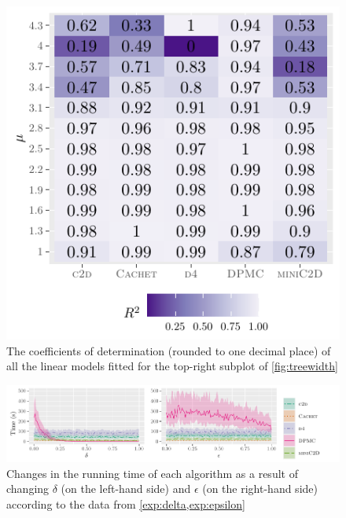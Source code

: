 \documentclass{article}
\theoremstyle{definition}
\begin{document}
\begin{figure}[t]
  \centering
  \includegraphics{r2}
  \caption{The coefficients of determination (rounded to one decimal place) of
    all the linear models fitted for the top-right subplot of
    \cref{fig:treewidth}}\label{fig:r2}
\end{figure}

\begin{figure}[t]
  \centering
  \includegraphics{delta_epsilon}
  \caption{Changes in the running time of each algorithm as a result of changing
    $\delta$ (on the left-hand side) and $\epsilon$ (on the right-hand side)
    according to the data from
    \cref{exp:delta,exp:epsilon}}\label{fig:delta_epsilon}
\end{figure}
\end{document}
